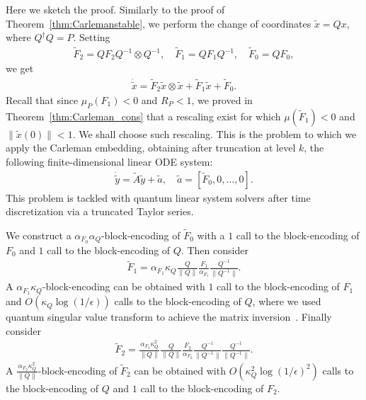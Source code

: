 \documentclass[superscriptaddress,onecolumn,nofootinbib,longbibliography,a4paper,accepted=2026-09-29]{quantumarticle}
\theoremstyle{plain}
\theoremstyle{definition}
\numberwithin{thm}{section}
\numberwithin{assumption}{section}
\numberwithin{lemma}{section}
\numberwithin{prop}{section}
\numberwithin{cor}{section}
\numberwithin{definition}{section}
\numberwithin{rmk}{section}
\numberwithin{equation}{section}
\begin{document}
Here we sketch the proof. Similarly to the proof of Theorem~\ref{thm:Carlemanstable}, we perform the change of coordinates $\tilde{x} = Q x$, where $Q^\dag Q = P$. Setting
\begin{align}
\label{eq:Ftildetransformation1}
    \tilde{F}_2 = Q F_2 Q^{-1} \otimes Q^{-1}, \quad \tilde{F}_1 = Q F_1 Q^{-1}, \quad \tilde{F}_0 = Q F_0,
\end{align}
we get
\begin{align}
\label{eq:ysystem1}
    \dot{\tilde{x}} = \tilde{F}_2 \tilde{x} \otimes \tilde{x} + \tilde{F}_1 \tilde{x} + \tilde{F}_0.
\end{align}
Recall that since $\mu_P(F_1)  <0$ and $R_P <1$, we proved in Theorem~\ref{thm:Carleman_cons} that a rescaling exist for which $\mu(\tilde{F}_1)<0$ and $\| \tilde{x}(0)\|<1$. We shall choose such rescaling. This is the problem to which we apply the Carleman embedding, obtaining after truncation at level $k$, the following finite-dimensional linear ODE system:
\begin{align}
    \dot{\tilde{y}} = \tilde{A} \tilde{y} + \tilde{a}, \quad \tilde{a} = [\tilde{F}_0, 0, \dots, 0].
\end{align} 
This problem is tackled with quantum linear system solvers after time discretization via a truncated Taylor series.

We construct a $\alpha_{F_0} \alpha_Q$-block-encoding of $\tilde{F}_0$ with a $1$ call to the block-encoding of $F_0$ and $1$ call to the block-encoding of $Q$. Then consider
\begin{align}
    \tilde{F}_1 = \alpha_{F_1} \kappa_Q \frac{Q}{\|Q\|}  \frac{F_1}{\alpha_{F_1}} \frac{Q^{-1}}{\|Q^{-1}\|}.
\end{align}
A $\alpha_{F_1} \kappa_Q$-block-encoding can be obtained with $1$ call to the block-encoding of $F_1$ and $O(\kappa_Q \log(1/\epsilon))$ calls to the block-encoding of $Q$, where we used quantum singular value transform to achieve the matrix inversion~\cite{gilyen2019quantum}. Finally consider
\begin{align}
    \tilde{F}_2 = \frac{\alpha_{F_2} \kappa^2_Q}{\|Q\|} \frac{Q}{\|Q\|}  \frac{F_2}{\alpha_{F_2}} \frac{Q^{-1}}{\|Q^{-1}\|}\frac{Q^{-1}}{\|Q^{-1}\|}.
\end{align}
A $\frac{\alpha_{F_2} \kappa_Q^2}{\|Q\|}$-block-encoding of $\tilde{F}_2$ can be obtained with $O(\kappa_Q^2 \log(1/\epsilon)^2)$ calls to the block-encoding of $Q$ and $1$ call to the block-encoding of $F_2$.
\end{document}
